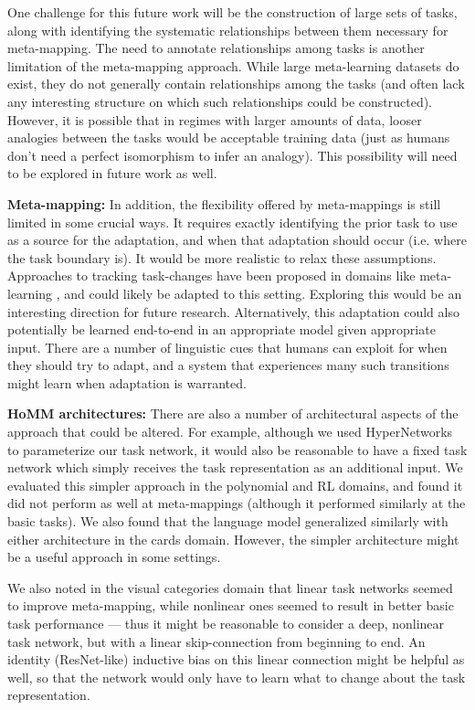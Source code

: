 One challenge for this future work will be the construction of large sets of tasks, along with identifying the systematic relationships between them necessary for meta-mapping. The need to annotate relationships among tasks is another limitation of the meta-mapping approach. While large meta-learning datasets do exist, they do not generally contain relationships among the tasks (and often lack any interesting structure on which such relationships could be constructed). However, it is possible that in regimes with larger amounts of data, looser analogies between the tasks would be acceptable training data (just as humans don't need a perfect isomorphism to infer an analogy). This possibility will need to be explored in future work as well. \par

\textbf{Meta-mapping:} In addition, the flexibility offered by meta-mappings is still limited in some crucial ways. It requires exactly identifying the prior task to use as a source for the adaptation, and when that adaptation should occur (i.e. where the task boundary is). It would be more realistic to relax these assumptions. Approaches to tracking task-changes have been proposed in domains like meta-learning \citep[e.g.][]{Nagabandi2019}, and could likely be adapted to this setting. Exploring this would be an interesting direction for future research. Alternatively, this adaptation could also potentially be learned end-to-end in an appropriate model given appropriate input. There are a number of linguistic cues that humans can exploit for when they should try to adapt, and a system that experiences many such transitions might learn when adaptation is warranted. \par 

\textbf{HoMM architectures:} There are also a number of architectural aspects of the approach that could be altered. For example, although we used HyperNetworks to parameterize our task network, it would also be reasonable to have a fixed task network which simply receives the task representation as an additional input. We evaluated this simpler approach in the polynomial and RL domains, and found it did not perform as well at meta-mappings (although it performed similarly at the basic tasks). We also found that the language model generalized similarly with either architecture in the cards domain. However, the simpler architecture might be a useful approach in some settings.\par 

We also noted in the visual categories domain that linear task networks seemed to improve meta-mapping, while nonlinear ones seemed to result in better basic task performance --- thus it might be reasonable to consider a deep, nonlinear task network, but with a linear skip-connection from beginning to end. An identity (ResNet-like) inductive bias on this linear connection might be helpful as well, so that the network would only have to learn what to change about the task representation. \par 


